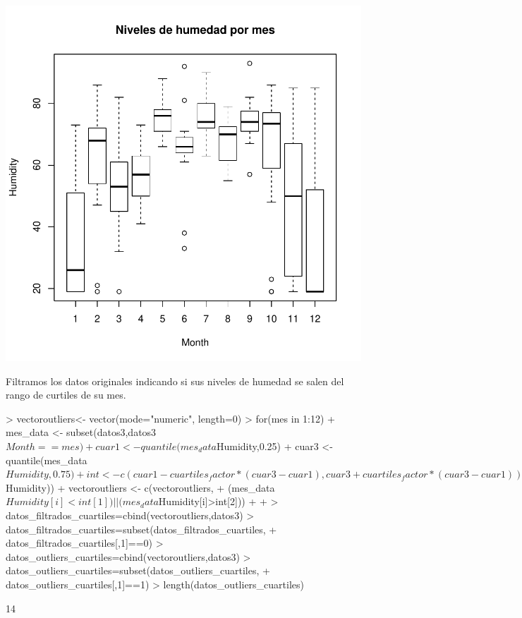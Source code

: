 \documentclass [a4paper] {article}
\begin{document}
\begin{center}
\includegraphics{entrega-datos_humedad_mes_cuart}
\end{center}

Filtramos los datos originales indicando si sus niveles de humedad se salen del rango de curtiles de su mes.
\begin{Schunk}
\begin{Sinput}
> vectoroutliers<- vector(mode="numeric", length=0)
> for(mes in 1:12){
+   mes_data <- subset(datos3,datos3$Month==mes)
+   cuar1 <- quantile(mes_data$Humidity,0.25)
+   cuar3 <- quantile(mes_data$Humidity,0.75)
+   int <- c(cuar1-cuartiles_factor*(cuar3-cuar1), cuar3+cuartiles_factor*(cuar3-cuar1))
+   for(i in 1:length(mes_data$Humidity)){
+     vectoroutliers <- c(vectoroutliers, 
+       (mes_data$Humidity[i]<int[1])||(mes_data$Humidity[i]>int[2]))
+   }
+ }
> datos_filtrados_cuartiles=cbind(vectoroutliers,datos3)
> datos_filtrados_cuartiles=subset(datos_filtrados_cuartiles,
+   datos_filtrados_cuartiles[,1]==0)
> datos_outliers_cuartiles=cbind(vectoroutliers,datos3)
> datos_outliers_cuartiles=subset(datos_outliers_cuartiles,
+   datos_outliers_cuartiles[,1]==1)
> length(datos_outliers_cuartiles)
\end{Sinput}
\begin{Soutput}
[1] 14
\end{Soutput}
\end{Schunk}
\end{document}
